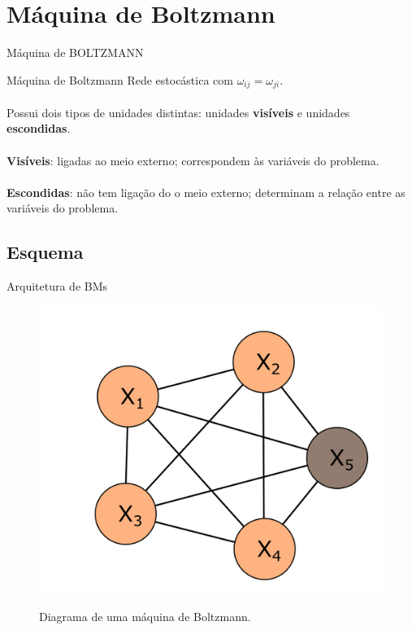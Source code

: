 \section{Máquina de Boltzmann}

\begin{frame}
  \justifying%
  \begin{alertblock}{}
    \centering
    Máquina de BOLTZMANN
  \end{alertblock}
\end{frame}

\begin{frame}{Máquina de Boltzmann}%
  \justifying%
  Rede estocástica com $\omega_{ij} = \omega_{ji}$.
  \\~\\
  Possui dois tipos de unidades distintas: unidades \textbf{visíveis} e unidades \textbf{escondidas}.
  \\~\\
  \textbf{Visíveis}: ligadas ao meio externo; correspondem às variáveis do problema.
  \\~\\
  \textbf{Escondidas}: não tem ligação do o meio externo; determinam a relação entre as variáveis do problema.
\end{frame}

\subsection{Esquema}
\begin{frame}{Arquitetura de BMs}%
  \begin{figure}[h]{}%
    \label{fig:bm-diagram-1}%
    \includegraphics[scale=0.5]{images/bm_1.png}
    \caption{Diagrama de uma máquina de Boltzmann.}
  \end{figure}
\end{frame}

